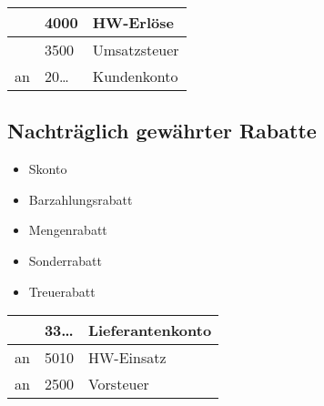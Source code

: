 \documentclass[letterpaper,10pt,english]{sphinxmanual}
\begin{document}
\begin{savenotes}\sphinxattablestart
\centering
\begin{tabulary}{\linewidth}[t]{|T|T|T|}
\hline
&
4000
&
HW-Erlöse
\\
\hline&
3500
&
Umsatzsteuer
\\
\hline
an
&
20…
&
Kundenkonto
\\
\hline
\end{tabulary}
\par
\sphinxattableend\end{savenotes}


\subsection{Nachträglich gewährter Rabatte}
\label{\detokenize{pool1:nachtraglich-gewahrter-rabatte}}
\begin{DUlineblock}{0em}
\item[] 
\end{DUlineblock}
\begin{itemize}
\item {} 
Skonto

\item {} 
Barzahlungsrabatt

\item {} 
Mengenrabatt

\item {} 
Sonderrabatt

\item {} 
Treuerabatt

\end{itemize}

\begin{DUlineblock}{0em}
\item[] 
\end{DUlineblock}


\begin{savenotes}\sphinxattablestart
\centering
\begin{tabulary}{\linewidth}[t]{|T|T|T|}
\hline
&
33…
&
Lieferantenkonto
\\
\hline
an
&
5010
&
HW-Einsatz
\\
\hline
an
&
2500
&
Vorsteuer
\\
\hline
\end{tabulary}
\par
\sphinxattableend\end{savenotes}
\end{document}
